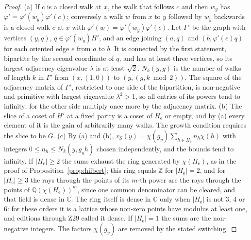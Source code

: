 \begin{proof}
(a) If $c$ is a closed walk at $x$, the walk that follows $c$ and then $w_y$ has $\varphi'=\varphi'(w_y)\varphi'(c)$; conversely a walk $w$ from $x$ to $y$ followed by $w_y$ backwards is a closed walk $c$ at $x$ with $\varphi'(w)=\varphi'(w_y)\varphi'(c)$. Let $\Gamma'$ be the graph with vertices $(y,q)$, $q\in\varphi'(w_y)H'$, and an edge joining $(a,q)$ and $(b,\varphi'(e)q)$ for each oriented edge $e$ from $a$ to $b$. It is connected by the first statement, bipartite by the second coordinate of $q$, and has at least three vertices, so its largest adjacency eigenvalue $\lambda$ is at least $\sqrt2$. $N_k(y,g)$ is the number of walks of length $k$ in $\Gamma'$ from $(x,(1,0))$ to $(y,(g,k\bmod2))$. The square of the adjacency matrix of $\Gamma'$, restricted to one side of the bipartition, is non-negative and primitive with largest eigenvalue $\lambda^2>1$, so all entries of its powers tend to infinity; for the other side multiply once more by the adjacency matrix. (b) The slice of a coset of $H'$ at a fixed parity is a coset of $H_{\mathrm e}$ or empty, and by (a) every element of it is the gain of arbitrarily many walks. The growth condition requires the slice to be $G$. (c) By (a) and (b), $v_S(y)=\chi(g_y)\sum_{h\in H_{\mathrm e}}n_h\chi(h)$ with integers $0\le n_h\le N_k(y,g_yh)$ chosen independently, and the bounds tend to infinity. If $|H_{\mathrm e}|\ge2$ the sums exhaust the ring generated by $\chi(H_{\mathrm e})$, as in the proof of Proposition~\ref{prop:hilbert}; this ring equals $\mathbb{Z}$ for $|H_{\mathrm e}|=2$, and for $|H_{\mathrm e}|\ge3$ the rays through the points of its $m$-th power are the rays through the points of $\mathbb{Q}(\chi(H_{\mathrm e}))^{m}$, since one common denominator can be cleared, and that field is dense in $\mathbb{C}$. The ring itself is dense in $\mathbb{C}$ only when $|H_{\mathrm e}|$ is not $3$, $4$ or $6$: for these orders it is a lattice whose non-zero points have modulus at least one, and editions through Z29 called it dense. If $|H_{\mathrm e}|=1$ the sums are the non-negative integers. The factors $\chi(g_y)$ are removed by the stated switching.
\end{proof}

